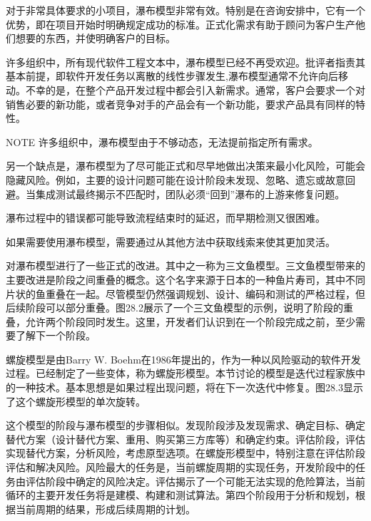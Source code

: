 对于非常具体要求的小项目，瀑布模型非常有效。特别是在咨询安排中，它有一个优势，即在项目开始时明确规定成功的标准。正式化需求有助于顾问为客户生产他们想要的东西，并使明确客户的目标。


许多组织中，所有现代软件工程文本中，瀑布模型已经不再受欢迎。批评者指责其基本前提，即软件开发任务以离散的线性步骤发生,瀑布模型通常不允许向后移动。不幸的是，在整个产品开发过程中都会引入新需求。通常，客户会要求一个对销售必要的新功能，或者竞争对手的产品会有一个新功能，要求产品具有同样的特性。

\begin{myNotic}{NOTE}
许多组织中，瀑布模型由于不够动态，无法提前指定所有需求。
\end{myNotic}

另一个缺点是，瀑布模型为了尽可能正式和尽早地做出决策来最小化风险，可能会隐藏风险。例如，主要的设计问题可能在设计阶段未发现、忽略、遗忘或故意回避。当集成测试最终揭示不匹配时，团队必须“回到”瀑布的上游来修复问题。

瀑布过程中的错误都可能导致流程结束时的延迟，而早期检测又很困难。

如果需要使用瀑布模型，需要通过从其他方法中获取线索来使其更加灵活。


对瀑布模型进行了一些正式的改进。其中之一称为三文鱼模型。三文鱼模型带来的主要改进是阶段之间重叠的概念。这个名字来源于日本的一种鱼片寿司，其中不同片状的鱼重叠在一起。尽管模型仍然强调规划、设计、编码和测试的严格过程，但后续阶段可以部分重叠。图28.2展示了一个三文鱼模型的示例，说明了阶段的重叠，允许两个阶段同时发生。这里，开发者们认识到在一个阶段完成之前，至少需要了解下一个阶段。



螺旋模型是由Barry W. Boehm在1986年提出的，作为一种以风险驱动的软件开发过程。已经制定了一些变体，称为螺旋形模型。本节讨论的模型是迭代过程家族中的一种技术。基本思想是如果过程出现问题，将在下一次迭代中修复。图28.3显示了这个螺旋形模型的单次旋转。

这个模型的阶段与瀑布模型的步骤相似。发现阶段涉及发现需求、确定目标、确定替代方案（设计替代方案、重用、购买第三方库等）和确定约束。评估阶段，评估实现替代方案，分析风险，考虑原型选项。在螺旋形模型中，特别注意在评估阶段评估和解决风险。风险最大的任务是，当前螺旋周期的实现任务，开发阶段中的任务由评估阶段中确定的风险决定。评估揭示了一个可能无法实现的危险算法，当前循环的主要开发任务将是建模、构建和测试算法。第四个阶段用于分析和规划，根据当前周期的结果，形成后续周期的计划。

